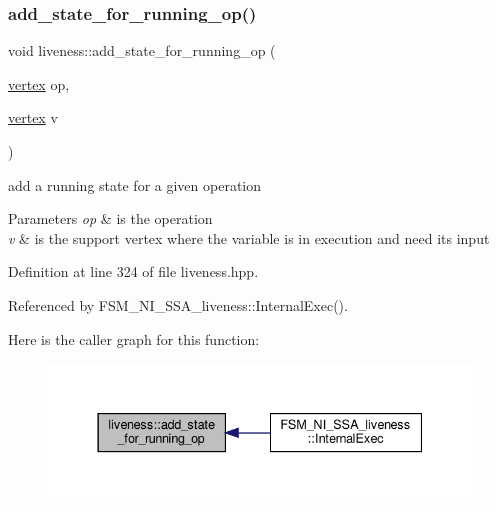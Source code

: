 \subsubsection{\texorpdfstring{add\+\_\+state\+\_\+for\+\_\+running\+\_\+op()}{add\_state\_for\_running\_op()}}
{\footnotesize\ttfamily void liveness\+::add\+\_\+state\+\_\+for\+\_\+running\+\_\+op (\begin{DoxyParamCaption}\item[{\hyperlink{graph_8hpp_abefdcf0544e601805af44eca032cca14}{vertex}}]{op,  }\item[{\hyperlink{graph_8hpp_abefdcf0544e601805af44eca032cca14}{vertex}}]{v }\end{DoxyParamCaption})\hspace{0.3cm}{\ttfamily [inline]}}



add a running state for a given operation 


\begin{DoxyParams}{Parameters}
{\em op} & is the operation \\
\hline
{\em v} & is the support vertex where the variable is in execution and need its input \\
\hline
\end{DoxyParams}


Definition at line 324 of file liveness.\+hpp.



Referenced by F\+S\+M\+\_\+\+N\+I\+\_\+\+S\+S\+A\+\_\+liveness\+::\+Internal\+Exec().

Here is the caller graph for this function\+:
\nopagebreak
\begin{figure}[H]
\begin{center}
\leavevmode
\includegraphics[width=337pt]{d3/d1f/classliveness_a9c715edd104bd38483f3baeb47cdebce_icgraph}
\end{center}
\end{figure}
\mbox{\label{classliveness_a289b0e123f91d1cfdda297f302966bee}} 
